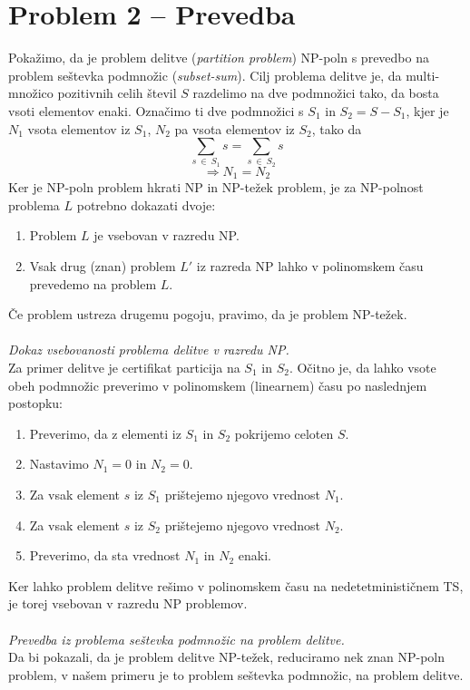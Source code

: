 \documentclass[a4paper,11pt]{article}
\begin{document}
\section*{Problem 2 -- Prevedba}
Pokažimo, da je problem delitve (\textit{partition problem}) NP-poln s prevedbo na problem seštevka podmnožic (\textit{subset-sum}). 
Cilj problema delitve je, da multi-množico pozitivnih celih števil $S$ razdelimo na dve podmnožici tako, da bosta vsoti elementov enaki.
Označimo ti dve podmnožici s $S_1$ in $S_2 = S - S_1$, kjer je $N_1$ vsota elementov iz $S_1$, $N_2$ pa vsota elementov iz $S_2$, tako da
$$
\sum_{s \ \in \ S_1} s = \sum_{s \ \in \ S_2} s 
$$
$$
\Rightarrow N_1 = N_2
$$
Ker je NP-poln problem hkrati NP in NP-težek problem, je za NP-polnost problema $L$ potrebno dokazati dvoje:
\begin{enumerate}
    \item Problem $L$ je vsebovan v razredu NP.
    \item Vsak drug (znan) problem $L'$ iz razreda NP lahko v polinomskem času prevedemo na problem $L$. 
\end{enumerate}
\noindent
Če problem ustreza drugemu pogoju, pravimo, da je problem NP-težek.
\\
\\
\textit{Dokaz vsebovanosti problema delitve v razredu NP.}
\\
Za primer delitve je certifikat particija na  $S_1$ in $S_2$. 
Očitno je, da lahko vsote obeh podmnožic preverimo v polinomskem (linearnem) času po naslednjem postopku:
\begin{enumerate}
    \item Preverimo, da z elementi iz $S_1$ in $S_2$ pokrijemo celoten $S$.
    \item Nastavimo $N_1 = 0$ in $N_2 = 0$.
    \item Za vsak element $s$ iz $S_1$ prištejemo njegovo vrednost $N_1$.
    \item Za vsak element $s$ iz $S_2$ prištejemo njegovo vrednost $N_2$.
    \item Preverimo, da sta vrednost $N_1$ in $N_2$ enaki.
\end{enumerate}
Ker lahko problem delitve rešimo v polinomskem času na nedetetminističnem TS, je torej vsebovan v razredu NP problemov.
\\
\\
\textit{Prevedba iz problema seštevka podmnožic na problem delitve.}
\\
Da bi pokazali, da je problem delitve NP-težek, reduciramo nek znan NP-poln problem, v našem primeru je to problem seštevka podmnožic, na problem delitve.
\end{document}
